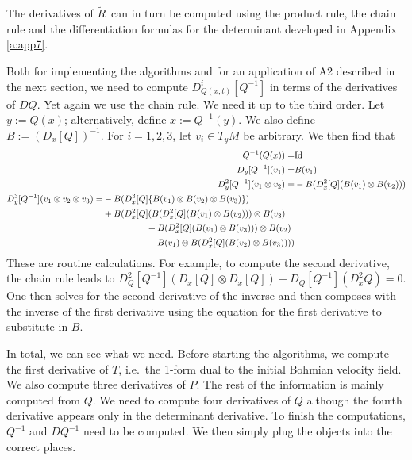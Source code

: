 \documentclass[11pt]{article}
\theoremstyle{remark}
\begin{document}
The derivatives of \ensuremath{\tilde R}\ can in turn be computed using the product rule,
the chain rule and the differentiation formulas for the determinant
developed in Appendix \ref{a:app7}. 


Both for implementing
 the algorithms and for an application of A2 described in the
next section, we need to compute $D^i_{Q(x,t)} [Q^{-1}]$ in terms  of the
derivatives of $DQ$. Yet again we use the chain rule.  We need it up
to the third order. Let $y \ensuremath{:=} Q(x)$; alternatively, define $x \ensuremath{:=}
Q^{-1} (y)$. We also define $\ensuremath{B} \ensuremath{:=} (D_x [Q])^{-1}$. For
$i=1,2,3$, let  $v_i
\in T_yM$ be arbitrary. 
 We then find that
\begin{align}
Q^{-1} (Q(x)) =& \ensuremath{\text{Id}} \\
D_{y} [Q^{-1}] (v_1) =& B (v_1) \\
D_{y}^2 [Q^{-1}](v_1 \otimes v_2)
 =& -B (D^2_x [Q] (B (v_1) \otimes B (v_2))) \\
\begin{split}
D_{y}^3 [Q^{-1}] (v_1\otimes v_2\otimes v_3)  =& 
-B (D^3_x [Q] \{B(v_1)\otimes B(v_2) \otimes
B(v_3) \} ) \\ 
& + B (D^2_x [Q] (B(  
D_x^2 [Q] ( B (v_1) \otimes B (v_2)))  \otimes B(v_3)   \\
& \hspace{.68in} + B(D_x^2 [Q] ( B (v_1) \otimes B (v_3)))  \otimes
B(v_2)  \\ 
& \hspace{.68in} + B( v_1) \otimes B(D_x^2 [Q] ( B (v_2) \otimes B (v_3) ))) 
\end{split}
\end{align}
These are routine calculations. For example, to
compute the second derivative, the chain rule leads to $D^2_Q
[Q^{-1}](D_x [Q] \otimes D_x[Q]) + D_Q [Q^{-1}] (D^2_x Q) = 0$. One then
solves for the second derivative of the inverse and then composes
with the inverse of the first derivative using 
the equation
for the first derivative to substitute in $B$.

In total, we can see what we need. Before starting the algorithms, we
compute the first derivative of $T$, i.e.\ 
the 1-form dual to the initial Bohmian velocity field. We also compute three
derivatives of $P$. The rest of the information is mainly computed
from $Q$. 
We need to compute four derivatives of $Q$ although 
the fourth derivative appears only in the determinant derivative. 
To finish the computations, $Q^{-1}$ and $DQ^{-1}$ need to be
computed. We then simply plug the objects into the correct places.  
\end{document}
